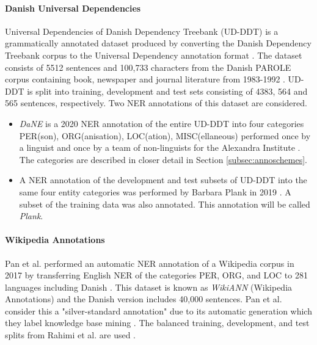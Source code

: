 \documentclass[main.tex]{subfiles}
\begin{document}
\paragraph{Danish Universal Dependencies}
Universal Dependencies of Danish Dependency Treebank (UD-DDT) is a grammatically annotated dataset produced by converting the Danish Dependency Treebank corpus \cite{kromann2003ddt} to the Universal Dependency annotation format \cite{johann2015udddt}.
The dataset consists of 5512 sentences and 100,733 characters from the Danish PAROLE corpus containing book, newspaper and journal literature from 1983-1992 \cite{christensen1998parole}.
UD-DDT is split into training, development and test sets consisting of 4383, 564 and 565 sentences, respectively.
Two NER annotations of this dataset are considered.
\begin{itemize}
    \item \emph{DaNE} is a 2020 NER annotation of the entire UD-DDT into four categories PER(son), ORG(anisation), LOC(ation), MISC(ellaneous) performed once by a linguist and once by a team of non-linguists for the Alexandra Institute \cite[Sec. 4]{hvingelby2020dane}.
    The categories are described in closer detail in Section \ref{subsec:annoschemes}.
    \item A NER annotation of the development and test subsets of UD-DDT into the same four entity categories was performed by Barbara Plank in 2019 \cite{plank2019neural}.
    A subset of the training data was also annotated.
    This annotation will be called \emph{Plank}.
\end{itemize}

\paragraph{Wikipedia Annotations}
Pan et al. performed an automatic NER annotation of a Wikipedia corpus in 2017 by transferring English NER of the categories PER, ORG, and LOC to 281 languages including Danish \cite{pan2017wikiann}.
This dataset is known as \emph{WikiANN} (Wikipedia Annotations) and the Danish version includes 40,000 sentences.
Pan et al. consider this a "silver-standard annotation" due to its automatic generation which they label knowledge base mining \cite[1946]{pan2017wikiann}.
The balanced training, development, and test splits from Rahimi et al. are used \cite{rahimi2019transfer}.
\end{document}
